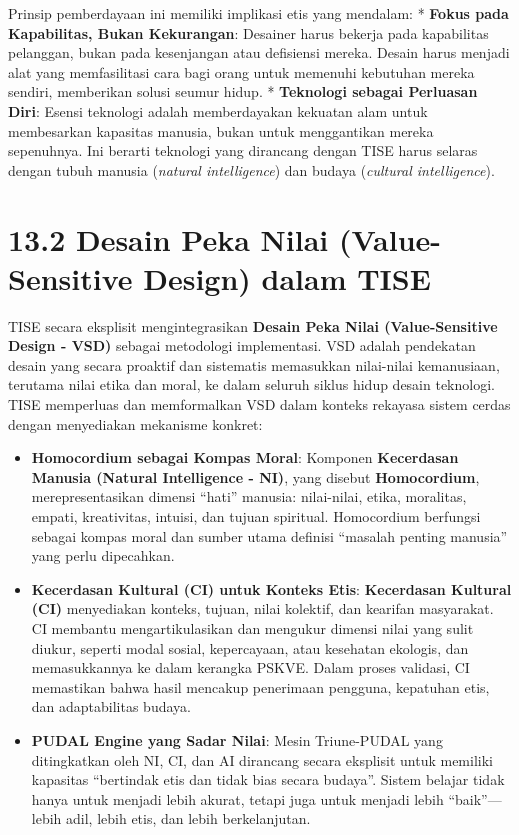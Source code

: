 \documentclass[
  letterpaper,
  DIV=11,
  numbers=noendperiod]{scrreprt}
\providecommand{\tightlist}{%
  \setlength{\itemsep}{0pt}\setlength{\parskip}{0pt}}
\begin{document}
Prinsip pemberdayaan ini memiliki implikasi etis yang mendalam: *
\textbf{Fokus pada Kapabilitas, Bukan Kekurangan}: Desainer harus
bekerja pada kapabilitas pelanggan, bukan pada kesenjangan atau
defisiensi mereka. Desain harus menjadi alat yang memfasilitasi cara
bagi orang untuk memenuhi kebutuhan mereka sendiri, memberikan solusi
seumur hidup. * \textbf{Teknologi sebagai Perluasan Diri}: Esensi
teknologi adalah memberdayakan kekuatan alam untuk membesarkan kapasitas
manusia, bukan untuk menggantikan mereka sepenuhnya. Ini berarti
teknologi yang dirancang dengan TISE harus selaras dengan tubuh manusia
(\emph{natural intelligence}) dan budaya (\emph{cultural intelligence}).

\section{\texorpdfstring{\textbf{13.2 Desain Peka Nilai (Value-Sensitive
Design) dalam
TISE}}{13.2 Desain Peka Nilai (Value-Sensitive Design) dalam TISE}}\label{desain-peka-nilai-value-sensitive-design-dalam-tise}

TISE secara eksplisit mengintegrasikan \textbf{Desain Peka Nilai
(Value-Sensitive Design - VSD)} sebagai metodologi implementasi. VSD
adalah pendekatan desain yang secara proaktif dan sistematis memasukkan
nilai-nilai kemanusiaan, terutama nilai etika dan moral, ke dalam
seluruh siklus hidup desain teknologi. TISE memperluas dan memformalkan
VSD dalam konteks rekayasa sistem cerdas dengan menyediakan mekanisme
konkret:

\begin{itemize}
\tightlist
\item
  \textbf{Homocordium sebagai Kompas Moral}: Komponen \textbf{Kecerdasan
  Manusia (Natural Intelligence - NI)}, yang disebut
  \textbf{Homocordium}, merepresentasikan dimensi ``hati'' manusia:
  nilai-nilai, etika, moralitas, empati, kreativitas, intuisi, dan
  tujuan spiritual. Homocordium berfungsi sebagai kompas moral dan
  sumber utama definisi ``masalah penting manusia'' yang perlu
  dipecahkan.
\item
  \textbf{Kecerdasan Kultural (CI) untuk Konteks Etis}:
  \textbf{Kecerdasan Kultural (CI)} menyediakan konteks, tujuan, nilai
  kolektif, dan kearifan masyarakat. CI membantu mengartikulasikan dan
  mengukur dimensi nilai yang sulit diukur, seperti modal sosial,
  kepercayaan, atau kesehatan ekologis, dan memasukkannya ke dalam
  kerangka PSKVE. Dalam proses validasi, CI memastikan bahwa hasil
  mencakup penerimaan pengguna, kepatuhan etis, dan adaptabilitas
  budaya.
\item
  \textbf{PUDAL Engine yang Sadar Nilai}: Mesin Triune-PUDAL yang
  ditingkatkan oleh NI, CI, dan AI dirancang secara eksplisit untuk
  memiliki kapasitas ``bertindak etis dan tidak bias secara budaya''.
  Sistem belajar tidak hanya untuk menjadi lebih akurat, tetapi juga
  untuk menjadi lebih ``baik''---lebih adil, lebih etis, dan lebih
  berkelanjutan.
\end{itemize}
\end{document}
